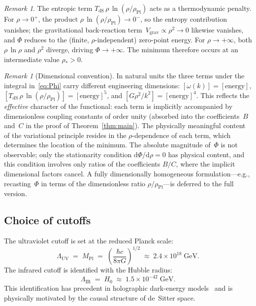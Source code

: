 \documentclass[12pt,a4paper]{article}
\theoremstyle{definition}
\theoremstyle{plain}
\theoremstyle{remark}
\newtheorem{remark}[definition]{Remark}
\newcommand{\LUV}{\Lambda_{\mathrm{UV}}}
\newcommand{\LIR}{\Lambda_{\mathrm{IR}}}
\newcommand{\dd}{\mathrm{d}}
\begin{document}
\begin{remark}
The entropic term $T_{\mathrm{dS}}\,\rho\,\ln(\rho/\rho_{\mathrm{Pl}})$
acts as a thermodynamic penalty.  For $\rho \to 0^{+}$, the product
$\rho\,\ln(\rho/\rho_{\mathrm{Pl}}) \to 0^{-}$, so the entropy
contribution vanishes; the gravitational back-reaction
term~$V_{\mathrm{grav}} \propto \rho^{2} \to 0$ likewise vanishes, and
$\Phi$ reduces to the (finite, $\rho$-independent) zero-point energy.
For $\rho \to +\infty$, both $\rho\,\ln\rho$ and $\rho^{2}$ diverge,
driving $\Phi \to +\infty$.  The minimum therefore occurs at an
intermediate value $\rho_{\ast} > 0$.
\end{remark}

\begin{remark}[Dimensional convention]
In natural units the three terms under the integral
in~\eqref{eq:Phi} carry different engineering dimensions:
$[\omega(k)] = [\mathrm{energy}]$,
$[T_{\mathrm{dS}}\,\rho\,\ln(\rho/\rho_{\mathrm{Pl}})]
= [\mathrm{energy}]^{5}$, and
$[G\rho^{2}/k^{2}] = [\mathrm{energy}]^{4}$.
This reflects the \emph{effective} character of the
functional: each term is implicitly accompanied by
dimensionless coupling constants of order unity (absorbed
into the coefficients~$B$ and~$C$ in the proof of
Theorem~\ref{thm:main}).  The physically meaningful content
of the variational principle resides in the
$\rho$-dependence of each term, which determines the location
of the minimum.  The absolute magnitude of~$\Phi$ is not
observable; only the stationarity condition
$\dd\Phi/\dd\rho = 0$ has physical content, and this
condition involves only ratios of the coefficients
$B/C$, where the implicit dimensional factors cancel.
A fully dimensionally homogeneous formulation---e.g.,
recasting~$\Phi$ in terms of the dimensionless ratio
$\rho/\rho_{\mathrm{Pl}}$---is deferred to the full version.
\end{remark}

\subsection{Choice of cutoffs}

The ultraviolet cutoff is set at the reduced Planck scale:
\begin{equation}
  \LUV \;=\; M_{\mathrm{Pl}} \;=\;
  \left(\frac{\hbar c}{8\pi G}\right)^{1/2}
  \;\approx\; 2.4 \times 10^{18}\;\mathrm{GeV}.
\end{equation}
The infrared cutoff is identified with the Hubble radius:
\begin{equation}\label{eq:IR-cutoff}
  \LIR \;=\; H_0 \;\approx\; 1.5 \times 10^{-42}\;\mathrm{GeV}.
\end{equation}
This identification has precedent in holographic dark-energy
models~\cite{Li2004} and is physically motivated by the causal structure of
de~Sitter space.
\end{document}
